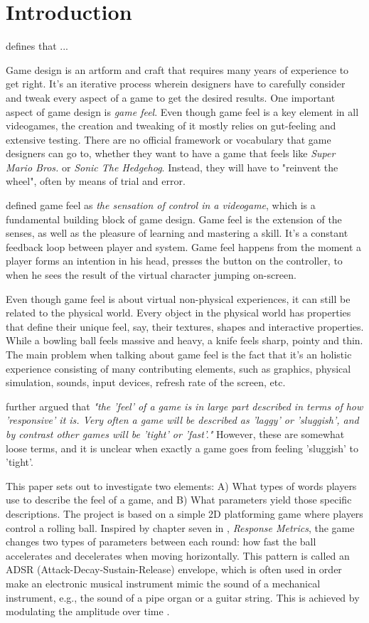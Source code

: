 \section{Introduction}
 defines that ...

Game design is an artform and craft that requires many years of experience to get right. It's an iterative process wherein designers have to carefully consider and tweak every aspect of a game to get the desired results. One important aspect of game design is \textit{game feel}. Even though game feel is a key element in all videogames, the creation and tweaking of it mostly relies on gut-feeling and extensive testing. There are no official framework or vocabulary that game designers can go to, whether they want to have a game that feels like \textit{Super Mario Bros.} or \textit{Sonic The Hedgehog}. Instead, they will have to "reinvent the wheel", often by means of trial and error.

\cite{swink} defined game feel as \textit{the sensation of control in a videogame}, which is a fundamental building block of game design. Game feel is the extension of the senses, as well as the pleasure of learning and mastering a skill. It's a constant feedback loop between player and system. Game feel happens from the moment a player forms an intention in his head, presses the button on the controller, to when he sees the result of the virtual character jumping on-screen.

Even though game feel is about virtual non-physical experiences, it can still be related to the physical world. Every object in the physical world has properties that define their unique feel, say, their textures, shapes and interactive properties. While a bowling ball feels massive and heavy, a knife feels sharp, pointy and thin. The main problem when talking about game feel is the fact that it's an holistic experience consisting of many contributing elements, such as graphics, physical simulation, sounds, input devices, refresh rate of the screen, etc.

\cite{measure_lag} further argued that \textit{"the 'feel' of a game is in large part described in terms of how 'responsive' it is. Very often a game will be described as 'laggy' or 'sluggish', and by contrast other games will be 'tight' or 'fast'."} However, these are somewhat loose terms, and it is unclear when exactly a game goes from feeling 'sluggish' to 'tight'.

This paper sets out to investigate two elements: A) What types of words players use to describe the feel of a game, and B) What parameters yield those specific descriptions. The project is based on a simple 2D platforming game where players control a rolling ball. Inspired by chapter seven in \cite{swink}, \textit{Response Metrics}, the game changes two types of parameters between each round: how fast the ball accelerates and decelerates when moving horizontally. This pattern is called an ADSR (Attack-Decay-Sustain-Release) envelope, which is often used in order make an electronic musical instrument mimic the sound of a mechanical instrument, e.g., the sound of a pipe organ or a guitar string. This is achieved by modulating the amplitude over time \cite{adsr}.

